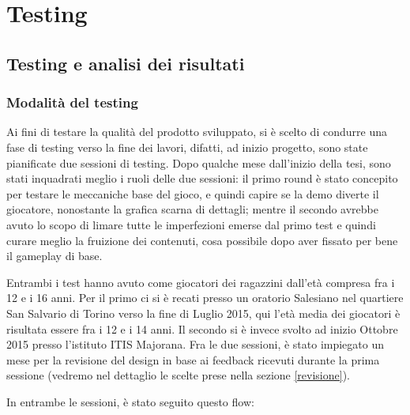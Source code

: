 \chapter{Testing}
\label{chap:testing}

\section{Testing e analisi dei risultati}

\subsection{Modalità del testing}

Ai fini di testare la qualità del prodotto sviluppato, si è scelto di condurre una fase di testing verso la fine dei lavori, difatti, ad inizio progetto, sono state pianificate due sessioni di testing. Dopo qualche mese dall'inizio della tesi, sono stati inquadrati meglio i ruoli delle due sessioni: il primo round è stato concepito per testare le meccaniche base del gioco, e quindi capire se la demo diverte il giocatore, nonostante la grafica scarna di dettagli; mentre il secondo avrebbe avuto lo scopo di limare tutte le imperfezioni emerse dal primo test e quindi curare meglio la fruizione dei contenuti, cosa possibile dopo aver fissato per bene il gameplay di base.

Entrambi i test hanno avuto come giocatori dei ragazzini dall'età compresa fra i 12 e i 16 anni. Per il primo ci si è recati presso un oratorio Salesiano nel quartiere San Salvario di Torino verso la fine di Luglio 2015, qui l'età media dei giocatori è risultata essere fra i 12 e i 14 anni. Il secondo si è invece svolto ad inizio Ottobre 2015 presso l'istituto ITIS Majorana. Fra le due sessioni, è stato impiegato un mese per la revisione del design in base ai feedback ricevuti durante la prima sessione (vedremo nel dettaglio le scelte prese nella sezione \ref{revisione}).

In entrambe le sessioni, è stato seguito questo flow:


